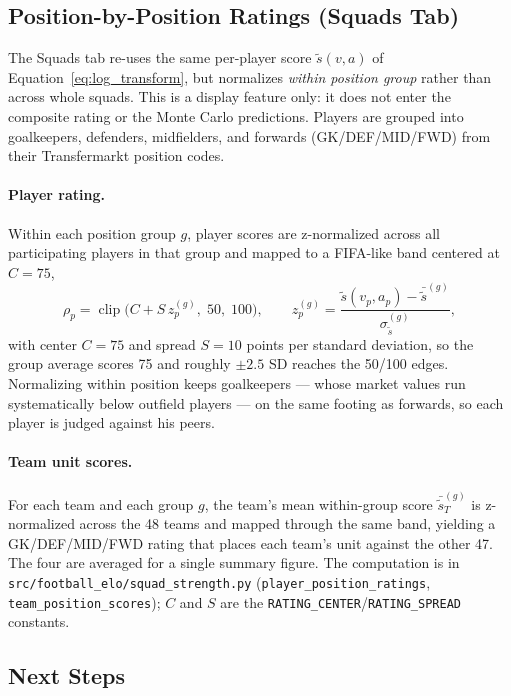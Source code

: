 \documentclass[11pt]{article}
\begin{document}
\subsection{Position-by-Position Ratings (Squads Tab)}
\label{sec:positionratings}

The Squads tab re-uses the same per-player score $\tilde{s}(v,a)$ of Equation~\eqref{eq:log_transform}, but normalizes \emph{within position group} rather than across whole squads. This is a display feature only: it does not enter the composite rating or the Monte Carlo predictions. Players are grouped into goalkeepers, defenders, midfielders, and forwards (GK/DEF/MID/FWD) from their Transfermarkt position codes.

\paragraph{Player rating.} Within each position group $g$, player scores are z-normalized across all participating players in that group and mapped to a FIFA-like band centered at $C = 75$,
\begin{equation}
\rho_p = \operatorname{clip}\!\bigl(C + S\,z_{p}^{(g)},\; 50,\; 100\bigr), \qquad
z_{p}^{(g)} = \frac{\tilde{s}(v_p, a_p) - \bar{\tilde{s}}^{(g)}}{\sigma_{\tilde{s}}^{(g)}},
\label{eq:player_rating}
\end{equation}
with center $C = 75$ and spread $S = 10$ points per standard deviation, so the group average scores 75 and roughly $\pm 2.5$ SD reaches the 50/100 edges. Normalizing within position keeps goalkeepers --- whose market values run systematically below outfield players --- on the same footing as forwards, so each player is judged against his peers.

\paragraph{Team unit scores.} For each team and each group $g$, the team's mean within-group score $\bar{\tilde{s}}_T^{(g)}$ is z-normalized across the 48 teams and mapped through the same band, yielding a GK/DEF/MID/FWD rating that places each team's unit against the other 47. The four are averaged for a single summary figure. The computation is in \texttt{src/football\_elo/squad\_strength.py} (\texttt{player\_position\_ratings}, \texttt{team\_position\_scores}); $C$ and $S$ are the \texttt{RATING\_CENTER}/\texttt{RATING\_SPREAD} constants.

\subsection{Next Steps}
\end{document}
